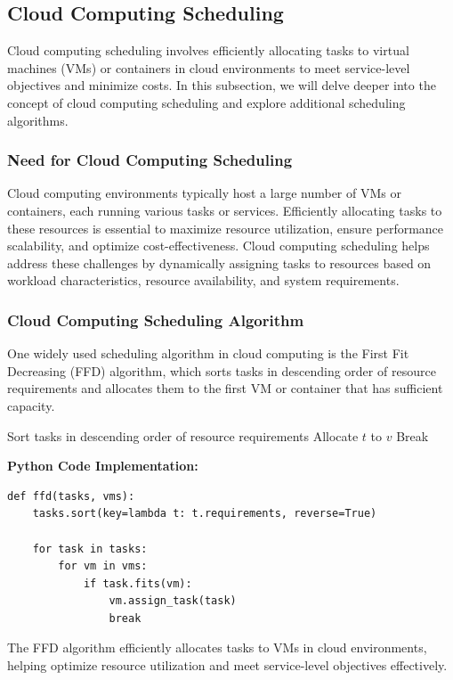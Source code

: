 \documentclass[12pt]{book} %
\begin{document}
\subsection{Cloud Computing Scheduling}

Cloud computing scheduling involves efficiently allocating tasks to virtual machines (VMs) or containers in cloud environments to meet service-level objectives and minimize costs. In this subsection, we will delve deeper into the concept of cloud computing scheduling and explore additional scheduling algorithms.

\subsubsection{Need for Cloud Computing Scheduling}

Cloud computing environments typically host a large number of VMs or containers, each running various tasks or services. Efficiently allocating tasks to these resources is essential to maximize resource utilization, ensure performance scalability, and optimize cost-effectiveness. Cloud computing scheduling helps address these challenges by dynamically assigning tasks to resources based on workload characteristics, resource availability, and system requirements.


\subsubsection{Cloud Computing Scheduling Algorithm}

One widely used scheduling algorithm in cloud computing is the First Fit Decreasing (FFD) algorithm, which sorts tasks in descending order of resource requirements and allocates them to the first VM or container that has sufficient capacity.
\FloatBarrier
\begin{algorithm}[H]
\caption{First Fit Decreasing (FFD) Algorithm}\label{alg:ffd}
\begin{algorithmic}[1]
\State Sort tasks in descending order of resource requirements
            \State Allocate $t$ to $v$
            \State Break
        \EndIf
    \EndFor
\EndFor
\EndProcedure
\end{algorithmic}
\end{algorithm}
\FloatBarrier
\textbf{Python Code Implementation:}
\FloatBarrier
\begin{lstlisting}
def ffd(tasks, vms):
    tasks.sort(key=lambda t: t.requirements, reverse=True)
    
    for task in tasks:
        for vm in vms:
            if task.fits(vm):
                vm.assign_task(task)
                break
\end{lstlisting}
\FloatBarrier
The FFD algorithm efficiently allocates tasks to VMs in cloud environments, helping optimize resource utilization and meet service-level objectives effectively.
\end{document}
